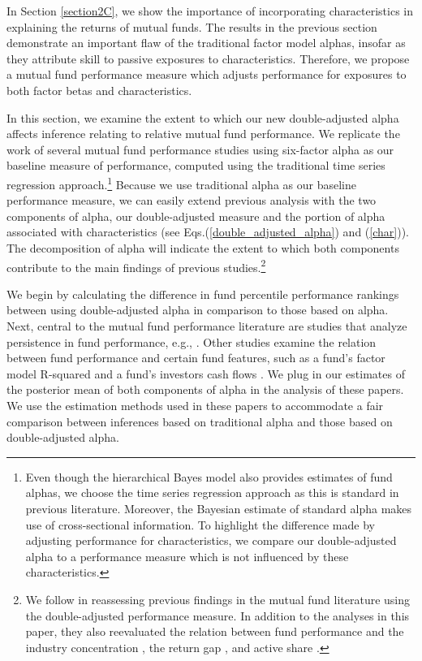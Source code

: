 \label{relative_performance}
In Section \ref{section2C}, we show the importance of incorporating characteristics in explaining the returns of mutual funds. The results in the previous section demonstrate an important flaw of the traditional factor model alphas, insofar as they attribute skill to passive exposures to characteristics. Therefore, we propose a mutual fund performance measure which adjusts performance for exposures to both factor betas and characteristics. 

In this section, we examine the extent to which our new double-adjusted alpha affects inference relating to relative mutual fund performance. We replicate the work of several mutual fund performance studies using  six-factor alpha as our baseline measure of performance, computed  using the traditional time series regression approach.\footnote{Even though the hierarchical Bayes model also provides estimates of fund alphas, we choose the time series regression approach as this is standard in previous literature. Moreover, the Bayesian estimate of standard alpha makes use of cross-sectional information. To highlight the difference made by adjusting performance for characteristics, we compare our double-adjusted alpha to a performance measure which is not influenced by these characteristics.} Because we use traditional alpha as our baseline performance measure, we can  easily extend previous analysis with the two components of alpha, our double-adjusted measure and the portion of alpha associated with characteristics (see Eqs.(\ref{double_adjusted_alpha}) and (\ref{char})). The decomposition of alpha will indicate the extent to which both components contribute to the main findings of previous studies.\footnote{We follow \citet{busse2017double} in reassessing previous findings in the mutual fund literature using the double-adjusted performance measure. In addition to the analyses in this paper, they also reevaluated the relation between fund performance and the industry concentration \citep{kacperczyk2005industry}, the return gap \citep{kacperczyk2008unobserved}, and active share \citep{cremers2009active}.  } 

We begin by calculating the difference in fund percentile performance rankings between using double-adjusted alpha in comparison to those based on alpha. Next, central to the mutual fund performance literature are studies that analyze persistence in fund performance, e.g., \citet{carhart1997persistence}. Other studies examine the relation between fund performance and certain fund features, such as a fund's factor model R-squared \citep{amihud2013mutual} and a fund's investors cash flows \citep{barber2016factors}. We plug in our estimates of the posterior mean of both components of alpha in the analysis of these papers. We use the estimation methods used in these papers to accommodate a fair comparison between inferences based on traditional alpha and those based on double-adjusted alpha.

